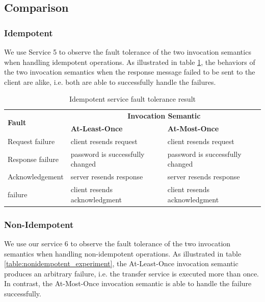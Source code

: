 \documentclass[12pt]{article}
\begin{document}
\subsection{Comparison}

\subsubsection{Idempotent}

We use Service 5 to observe the fault tolerance of the two invocation semantics when handling idempotent operations. As illustrated in table \ref{table:idempotent_experiment}, the behaviors of the two invocation semantics when the response message failed to be sent to the client are alike, i.e. both are able to successfully handle the failures.

\begin{table}[htbp!]
    \centering
    \caption{Idempotent service fault tolerance result}
    \label{table:idempotent_experiment}
    \begin{tabularx}{\textwidth}{X l l}
        \toprule
        \multirow{2}{*}{\textbf{Fault}} & \multicolumn{2}{c}{\textbf{Invocation Semantic}} \\
        \cmidrule{2-3}
        & \textbf{At-Least-Once} & \textbf{At-Most-Once} \\ 
        \midrule
       	Request failure & client resends request  & client resends request \\ 
    	\hline
    	Response failure & password is successfully changed & password is successfully changed \\ 
    	\hline
    	Acknowledgement & server resends response & server resends response \\
        failure & client resends acknowledgment & client resends acknowledgment \\ 
        \bottomrule
    \end{tabularx}
\end{table}

\subsubsection{Non-Idempotent}
We use our service 6 to observe the fault tolerance of the two invocation semantics when handling non-idempotent operations. As illustrated in table \ref{table:nonidempotent_experiment}, the At-Least-Once invocation semantic produces an arbitrary failure, i.e. the transfer service is executed more than once. In contrast, the At-Most-Once invocation semantic is able to handle the failure successfully.
\end{document}
